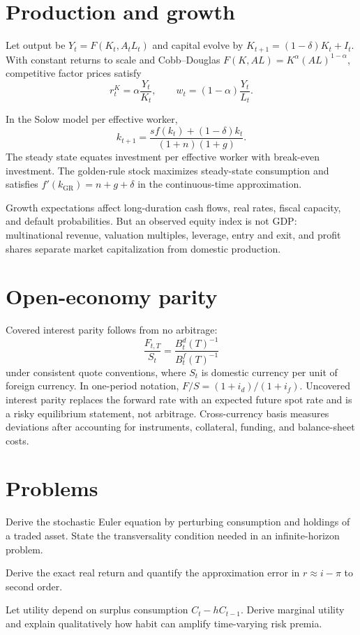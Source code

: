 \section{Production and growth}

Let output be $Y_t=F(K_t,A_tL_t)$ and capital evolve by
$K_{t+1}=(1-\delta)K_t+I_t$. With constant returns to scale and Cobb--Douglas
$F(K,AL)=K^\alpha(AL)^{1-\alpha}$, competitive factor prices satisfy
\[
r_t^K=\alpha\frac{Y_t}{K_t},\qquad
w_t=(1-\alpha)\frac{Y_t}{L_t}.
\]

In the Solow model per effective worker,
\[
k_{t+1}=\frac{s f(k_t)+(1-\delta)k_t}{(1+n)(1+g)}.
\]
The steady state equates investment per effective worker with break-even investment.
The golden-rule stock maximizes steady-state consumption and satisfies
$f'(k_{\mathrm{GR}})=n+g+\delta$ in the continuous-time approximation.

Growth expectations affect long-duration cash flows, real rates, fiscal capacity,
and default probabilities. But an observed equity index is not GDP: multinational
revenue, valuation multiples, leverage, entry and exit, and profit shares separate
market capitalization from domestic production.

\section{Open-economy parity}

Covered interest parity follows from no arbitrage:
\[
\frac{F_{t,T}}{S_t}
=\frac{B_t^{d}(T)^{-1}}{B_t^{f}(T)^{-1}}
\]
under consistent quote conventions, where $S_t$ is domestic currency per unit of
foreign currency. In one-period notation,
$F/S=(1+i_d)/(1+i_f)$. Uncovered interest parity replaces the forward rate with an
expected future spot rate and is a risky equilibrium statement, not arbitrage.
Cross-currency basis measures deviations after accounting for instruments,
collateral, funding, and balance-sheet costs.

\section{Problems}

\begin{exercise}
Derive the stochastic Euler equation by perturbing consumption and holdings of a
traded asset. State the transversality condition needed in an infinite-horizon
problem.
\end{exercise}
\begin{exercise}
Derive the exact real return and quantify the approximation error in
$r\approx i-\pi$ to second order.
\end{exercise}
\begin{exercise}
Let utility depend on surplus consumption $C_t-hC_{t-1}$. Derive marginal utility
and explain qualitatively how habit can amplify time-varying risk premia.
\end{exercise}


